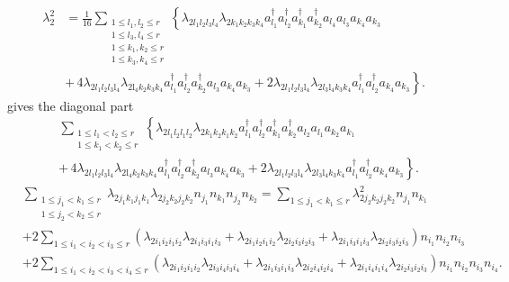 \documentclass[aps,preprint]{revtex4}%
\begin{document}
\begin{align}
\lambda_{2}^{2} &  =\frac{1}{16}\sum_{\substack{1\leq l_{1},l_{2}\leq r\\1\leq
l_{3},l_{4}\leq r\\1\leq k_{1},k_{2}\leq r\\1\leq k_{3},k_{4}\leq r}}\left\{
\lambda_{2l_{1}l_{2}l_{3}l_{4}}\lambda_{2k_{1}k_{2}k_{3}k_{4}}a_{l_{1}%
}^{\dagger}a_{l_{2}}^{\dagger}a_{k_{1}}^{\dagger}a_{k_{2}}^{\dagger}a_{l_{4}%
}a_{l_{3}}a_{k_{4}}a_{k_{3}}\right.  \nonumber\\
&  \left.  +\,4\lambda_{2l_{1}l_{2}l_{3}\mathrm{l}_{4}}\lambda_{2\mathrm{l}%
_{4}k_{2}k_{3}k_{4}}a_{l_{1}}^{\dagger}a_{l_{2}}^{\dagger}a_{k_{2}}^{\dagger
}a_{l_{3}}a_{k_{4}}a_{k_{3}}+2\lambda_{2l_{1}l_{2}l_{3}\mathrm{l}_{4}}%
\lambda_{2l_{3}\mathrm{l}_{4}k_{3}k_{4}}a_{l_{1}}^{\dagger}a_{l_{2}}^{\dagger
}a_{k_{4}}a_{k_{3}}\right\}  .
\end{align}
gives the diagonal part%
\begin{align}
&  \sum_{\substack{1\leq l_{1}<l_{2}\leq r\\1\leq k_{1}<k_{2}\leq r}}\left\{
\lambda_{2l_{1}l_{2}l_{1}l_{2}}\lambda_{2k_{1}k_{2}k_{1}k_{2}}a_{l_{1}%
}^{\dagger}a_{l_{2}}^{\dagger}a_{k_{1}}^{\dagger}a_{k_{2}}^{\dagger}a_{l_{2}%
}a_{l_{1}}a_{k_{2}}a_{k_{1}}\right.  \nonumber\\
&  \left.  +\,4\lambda_{2l_{1}l_{2}l_{3}\mathrm{l}_{4}}\lambda_{2\mathrm{l}%
_{4}k_{2}k_{3}k_{4}}a_{l_{1}}^{\dagger}a_{l_{2}}^{\dagger}a_{k_{2}}^{\dagger
}a_{l_{3}}a_{k_{4}}a_{k_{3}}+2\lambda_{2l_{1}l_{2}l_{3}\mathrm{l}_{4}}%
\lambda_{2l_{3}\mathrm{l}_{4}k_{3}k_{4}}a_{l_{1}}^{\dagger}a_{l_{2}}^{\dagger
}a_{k_{4}}a_{k_{3}}\right\}  .
\end{align}%
\begin{align}
&  \sum_{\substack{1\leq j_{1}<k_{1}\leq r\\1\leq j_{2}<k_{2}\leq r}%
}\lambda_{2j_{1}k_{1}j_{1}k_{1}}\lambda_{2j_{2}k_{2}j_{2}k_{2}}n_{j_{1}%
}n_{k_{1}}n_{j_{2}}n_{k_{2}}=\sum_{1\leq j_{1}<k_{1}\leq r}\lambda
_{2j_{2}k_{2}j_{2}k_{2}}^{2}n_{j_{1}}n_{k_{1}}\nonumber\\
&  +2\sum_{1\leq i_{1}<i_{2}<i_{3}\leq r}\left(  \lambda_{2i_{1}i_{2}%
i_{1}i_{2}}\lambda_{2i_{1}i_{3}i_{1}i_{3}}+\lambda_{2i_{1}i_{2}i_{1}i_{2}%
}\lambda_{2i_{2}i_{3}i_{2}i_{3}}+\lambda_{2i_{1}i_{3}i_{1}i_{3}}%
\lambda_{2i_{2}i_{3}i_{2}i_{3}}\right)  n_{i_{1}}n_{i_{2}}n_{i_{3}}\nonumber\\
&  +2\sum_{1\leq i_{1}<i_{2}<i_{3}<i_{4}\leq r}\left(  \lambda_{2i_{1}%
i_{2}i_{1}i_{2}}\lambda_{2i_{3}i_{4}i_{3}i_{4}}+\lambda_{2i_{1}i_{3}i_{1}%
i_{3}}\lambda_{2i_{2}i_{4}i_{2}i_{4}}+\lambda_{2i_{1}i_{4}i_{1}i_{4}}%
\lambda_{2i_{2}i_{3}i_{2}i_{3}}\right)  n_{i_{1}}n_{i_{2}}n_{i_{3}}n_{i_{4}}.
\end{align}
\end{document}
